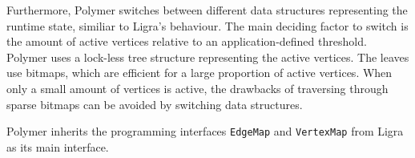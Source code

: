 Furthermore, Polymer switches between different data structures representing the runtime state, similiar to Ligra's behaviour. The main deciding factor to switch is the amount of active vertices relative to an application-defined threshold. Polymer uses a lock-less tree structure representing the active vertices. The leaves use bitmaps, which are efficient for a large proportion of active vertices. When only a small amount of vertices is active, the drawbacks of traversing through sparse bitmaps can be avoided by switching data structures. 

Polymer inherits the programming interfaces \texttt{EdgeMap} and \texttt{VertexMap} from Ligra as its main interface.
